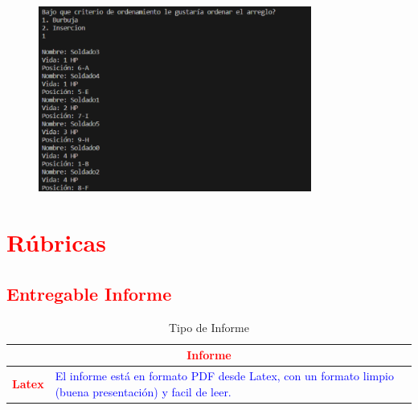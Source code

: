 \documentclass{article}
\begin{document}
	\begin{figure}[H]
		\centering
	\includegraphics[width=0.8\textwidth,keepaspectratio]{img/captura4.png}
	\end{figure}
	
	\section{\textcolor{red}{Rúbricas}}
	
	\subsection{\textcolor{red}{Entregable Informe}}
	\begin{table}[H]
		\caption{Tipo de Informe}
		\setlength{\tabcolsep}{0.5em} %
		{\renewcommand{\arraystretch}{1.5}%
		\begin{tabular}{|p{3cm}|p{12cm}|}
			\hline
			\multicolumn{2}{|c|}{\textbf{\textcolor{red}{Informe}}}  \\
			\hline 
			\textbf{\textcolor{red}{Latex}} & \textcolor{blue}{El informe está en formato PDF desde Latex,  con un formato limpio (buena presentación) y facil de leer.}   \\ 
			\hline 
			
			
		\end{tabular}
	}
	\end{table}
	
	\clearpage
	
\end{document}
